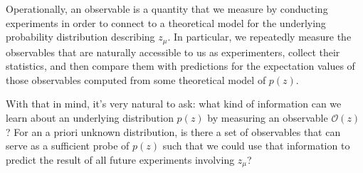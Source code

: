Operationally, an observable is a quantity that we measure by conducting experiments in order to connect to a theoretical model for the underlying probability distribution describing $z_\mu$. In particular, we repeatedly measure the observables that are naturally accessible to us as experimenters, collect their statistics, and then compare them with predictions for the expectation values of those observables computed from some theoretical model of $p(z)$.

With that in mind, it's very natural to ask: what kind of information can we learn about an underlying distribution $p(z)$ by measuring an observable $\mathcal{O}(z)$? For an a priori unknown distribution, is there a set of observables that can serve as a sufficient probe of $p(z)$ such that we could use that information to predict the result of all future experiments involving $z_\mu$?









